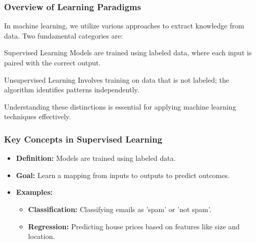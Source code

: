 \documentclass[aspectratio=169]{beamer}
\begin{document}
\frame{\titlepage}

\begin{frame}[fragile]
    \maketitle
\end{frame}

\begin{frame}[fragile]
    \frametitle{Overview of Learning Paradigms}
    In machine learning, we utilize various approaches to extract knowledge from data. Two fundamental categories are:
    \begin{block}{Supervised Learning}
        Models are trained using labeled data, where each input is paired with the correct output.
    \end{block}
    \begin{block}{Unsupervised Learning}
        Involves training on data that is not labeled; the algorithm identifies patterns independently.
    \end{block}
    Understanding these distinctions is essential for applying machine learning techniques effectively.
\end{frame}

\begin{frame}[fragile]
    \frametitle{Key Concepts in Supervised Learning}
    \begin{itemize}
        \item \textbf{Definition:} Models are trained using labeled data.
        \item \textbf{Goal:} Learn a mapping from inputs to outputs to predict outcomes.
        \item \textbf{Examples:}
        \begin{itemize}
            \item \textbf{Classification:} Classifying emails as 'spam' or 'not spam'.
            \item \textbf{Regression:} Predicting house prices based on features like size and location.
        \end{itemize}
    \end{itemize}
\end{frame}
\end{document}
